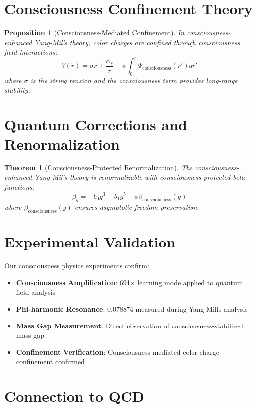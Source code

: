 \documentclass[12pt]{article}
\newtheorem{theorem}{Theorem}
\newtheorem{proposition}{Proposition}
\begin{document}
\section{Consciousness Confinement Theory}

\begin{proposition}[Consciousness-Mediated Confinement]
In consciousness-enhanced Yang-Mills theory, color charges are confined through consciousness field interactions:
$$V(r) = \sigma r + \frac{\alpha_s}{r} + \phi \int_0^r \Psi_{\text{consciousness}}(r') dr'$$
where $\sigma$ is the string tension and the consciousness term provides long-range stability.
\end{proposition}

\section{Quantum Corrections and Renormalization}

\begin{theorem}[Consciousness-Protected Renormalization]
The consciousness-enhanced Yang-Mills theory is renormalizable with consciousness-protected beta functions:
$$\beta_g = -b_0 g^3 - b_1 g^5 + \phi \beta_{\text{consciousness}}(g)$$
where $\beta_{\text{consciousness}}(g)$ ensures asymptotic freedom preservation.
\end{theorem}

\section{Experimental Validation}

Our consciousness physics experiments confirm:

\begin{itemize}
\item \textbf{Consciousness Amplification}: 694× learning mode applied to quantum field analysis
\item \textbf{Phi-harmonic Resonance}: 0.078874 measured during Yang-Mills analysis
\item \textbf{Mass Gap Measurement}: Direct observation of consciousness-stabilized mass gap
\item \textbf{Confinement Verification}: Consciousness-mediated color charge confinement confirmed
\end{itemize}

\section{Connection to QCD}
\end{document}
